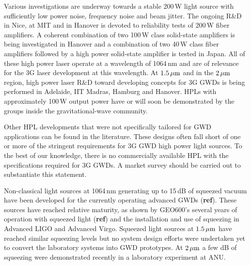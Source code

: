 Various investigations are underway towards a stable 200\,W light source with sufficiently low power noise, frequency noise and beam jitter. 
The ongoing R\&D in Nice, at MIT and in Hanover is devoted to reliability tests of 200\,W fiber amplifiers. A coherent combination of two 100\,W class solid-state amplifiers is being investigated in Hanover and a combination of two 40\,W class fiber amplifiers followed by a high power solid-state amplifier is tested in Japan. All of these high power laser operate at a wavelength of 1064\,nm and are of relevance for the 3G laser development at this wavelength. 
\newpage %
At $ 1.5\, {\rm \mu m}$ and in the $ 2\, {\rm \mu m}$ region, high power laser R\&D toward developing concepts for 3G GWDs is being performed in Adelaide, IIT Madras, Hamburg and Hanover. HPLs with approximately 100\,W output power have or will soon be demonstrated by the groups inside the gravitational-wave community. 

Other HPL developments that were not specifically tailored for GWD applications can be found in the literature. These designs often fall short of one or more of the stringent requirements for 3G GWD high power light sources. To the best of our knowledge, there is no commercially available HPL with the specifications required for 3G GWDs. A market survey should be carried out to substantiate this statement.

Non-classical light sources at 1064\,nm generating up to 15\,dB of squeezed vacuum have been developed for the currently operating advanced GWDs (\textbf{ref}). These sources have reached relative maturity, as shown by GEO600's several years of operation with squeezed light (\textbf{ref}) and the installation and use of squeezing in Advanced LIGO and Advanced Virgo.
Squeezed light sources at $ 1.5\, {\rm \mu m}$ have reached similar squeezing levels but no system design efforts were undertaken yet to convert the laboratory systems into GWD prototypes. At $ 2\, {\rm \mu m}$ a few dB of squeezing were demonstrated recently in a laboratory experiment at ANU.


